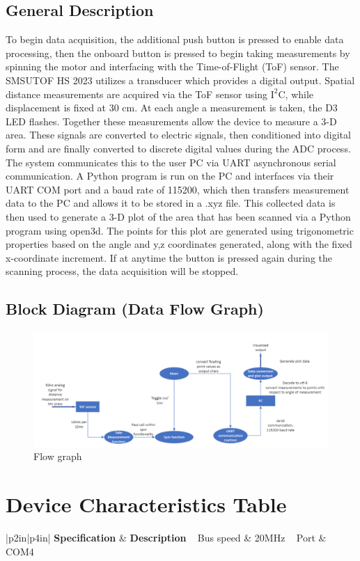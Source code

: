 \documentclass[12pt, letterpaper]{article}
\begin{document}
\subsection{General Description}
To begin data acquisition, the additional push button is pressed to enable data processing, then the onboard button is pressed to begin taking measurements by spinning the motor and interfacing with the Time-of-Flight (ToF) sensor. The SMSUTOF HS 2023 utilizes a transducer which provides a digital output. Spatial distance measurements are acquired via the ToF sensor using $\mathrm{I^2C}$, while displacement is fixed at 30 cm. At each angle a measurement is taken, the D3 LED flashes. Together these measurements allow the device to measure a 3-D area. These signals are converted to electric signals, then conditioned into digital form and are finally converted to discrete digital values during the ADC process. The system communicates this to the user PC via UART asynchronous serial communication. A Python program is run on the PC and interfaces via their UART COM port and a baud rate of 115200, which then transfers measurement data to the PC and allows it to be stored in a .xyz file. This collected data is then used to generate a 3-D plot of the area that has been scanned via a Python program using open3d. The points for this plot are generated using trigonometric properties based on the angle and y,z coordinates generated, along with the fixed x-coordinate increment. If at anytime the button is pressed again during the scanning process, the data acquisition will be stopped. 
\subsection{Block Diagram (Data Flow Graph)}
\begin{figure}[h]
    \centering
    \includegraphics[width=\textwidth]{images/flowgraph.png}
    \caption{Flow graph}
    \label{fig:flowgraph}
\end{figure}
\section{Device Characteristics Table}
\begin{tabular}{|p{2in}|p{4in}|}
\hline
\textbf{Specification} & \textbf{Description} \
\hline
Bus speed & 20MHz \
\hline
Port & COM4 \
\hline
\end{tabular}
\end{document}
